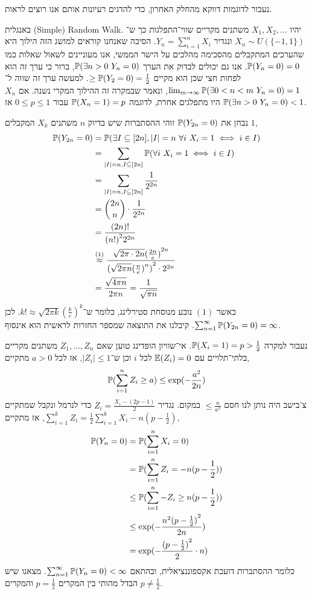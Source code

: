 נעבור לדוגמות דווקא מהחלק האחרון, כדי להדגים רעיונות אותם אנו רוצים לראות.
\begin{example}
	באנגלית (Simple) Random Walk.
	יהיו $X_1, X_2, \ldots$ משתנים מקריים שווי־התפלגות כך ש־$X_n \sim U(\{-1, 1\})$ ונגדיר $Y_n = \sum_{i = 1}^n X_i$.
	הסיבה שאנחנו קוראים למושג הזה הילוך היא שהערכים המתקבלים מהסכימה מהלכים על הישר הממשי, אנו מעוניינים לשאול שאלות כמו $\mathbb{P}(Y_n = 0) = 0$.
	אנו גם יכולים לבדוק את הערך $\mathbb{P}(\exists n > 0\ Y_n = 0)$, ברור כי ערך זה הוא לפחות חצי שכן הוא מקיים $\ge \mathbb{P}(Y_2 = 0) = \frac{1}{2}$.
	למעשה ערך זה שווה ל־$\lim_{m \to \infty} \mathbb{P}(\exists 0 < n < m\ Y_n = 0) = 1$, ונאמר שבמקרה זה ההילוך המקרי נשנה.
	אם $X_n$ היו מתפלגים אחרת, לדוגמה $\mathbb{P}(X_n = 1) = p$ עבור $0 \le p \le 1$ אז $\mathbb{P}(\exists n > 0\ Y_n = 0) < 1$.

	נבחן את $\mathbb{P}(Y_{2n} = 0)$ זוהי ההסתברות שיש בדיוק $n$ משתנים $X_k$ המקבלים $1$,
	\begin{align*}
		\mathbb{P}(Y_{2n} = 0)
		& = \mathbb{P}(\exists I \subseteq [2n], |I| = n\ \forall i\ X_i = 1 \iff i \in I) \\
		& = \sum_{|I| = n, I \subseteq [2n]} \mathbb{P}(\forall i\ X_i = 1 \iff i \in I) \\
		& = \sum_{|I| = n, I \subseteq [2n]} \frac{1}{2^{2n}} \\
		& = \binom{2n}{n} \cdot \frac{1}{2^{2n}} \\
		& = \frac{(2n)!}{{(n!)}^2 2^{2n}} \\
		& \overset{(1)}{\approx}  \frac{\sqrt{2 \pi \cdot 2n} {(\frac{2n}{e})}^{2n}}{{(\sqrt{2 \pi n} {(\frac{n}{e})}^n)}^2 \cdot 2^{2n}} \\
		& = \frac{\sqrt{4 \pi n}}{2 \pi n}
		= \frac{1}{\sqrt{\pi n}}
	\end{align*}
	כאשר $(1)$ נובע מנוסחת סטירלינג, כלומר ש־$k! \approx \sqrt{2 \pi k} {(\frac{k}{e})}^k$.
	לכן $\sum_{n = 1}^\infty \mathbb{P}(Y_{2n} = 0) = \infty$.
	קיבלנו את התוצאה שמספר החזרות לראשית הוא אינסוף.

	נעבור למקרה $\mathbb{P}(X_i = 1) = p > \frac{1}{2}$.
	אי־שוויון הופדינג טוען שאם $Z_1, \ldots, Z_n$ משתנים מקריים בלתי־תלויים עם $\mathbb{E}(Z_i) = 0$ לכל $i$ וכן ש־$|Z_i| \le 1$, אז לכל $a > 0$ מתקיים,
	\[
		\mathbb{P}(\sum_{i = 1}^n Z_i \ge a)
		\le \exp(-\frac{a^2}{2n})
	\]
	צ'בישב היה נותן לנו חסם $\le \frac{n}{a^2}$ במקום.
	נגדיר $Z_i = \frac{X_i - (2p - 1)}{2}$ כדי לנרמל ונקבל שמתקיים $\sum_{i = 1}^k Z_i = \frac{1}{2} \sum_{i = 1}^k X_i - n(p - \frac{1}{2})$, אז מתקיים,
	\begin{align*}
		\mathbb{P}(Y_n = 0)
		& = \mathbb{P}(\sum_{i = 1}^n X_i = 0) \\
		& = \mathbb{P}(\sum_{i = 1}^n Z_i = -n (p - \frac{1}{2})) \\
		& \le \mathbb{P}(\sum_{i = 1}^n -Z_i \ge n(p - \frac{1}{2})) \\
		& \le \exp(-\frac{n^2 {(p - \frac{1}{2})}^2}{2n}) \\
		& = \exp(-\frac{{(p - \frac{1}{2})}^2}{2} \cdot n)
	\end{align*}
	כלומר ההסתברות דועכת אקספוננציאלית, ובהתאם $\sum_{n = 1}^\infty \mathbb{P}(Y_n = 0) < \infty$.
	מצאנו שיש הבדל מהותי בין המקרים $p = \frac{1}{2}$ והמקרים $p \ne \frac{1}{2}$.


\end{example}
